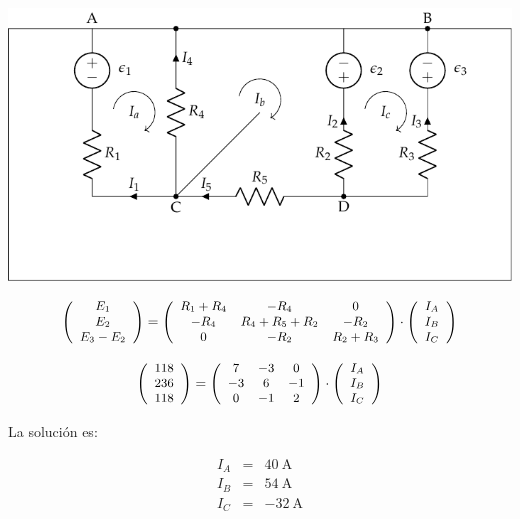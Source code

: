 \begin{center}
  \includegraphics{figuras/mallas_condensadores_sol.pdf}
\end{center}

\[
\small{
\left(\begin{array}{c}
    E_1\\
    E_2\\
    E_3 - E_2
  \end{array}\right) = \left(\begin{array}{ccc}
    R_1 + R_4 & -R_4 & 0\\
    -R_4 & R_4 + R_5 + R_2 & -R_{2}\\
    0 & -R_2 & R_2 + R_3
  \end{array}\right) \cdot \left(\begin{array}{c}
    I_{A}\\
    I_{B}\\
    I_{C}
  \end{array}\right)
}
\]

\[
\small{
\left(\begin{array}{c}
    118\\
    236\\
    118
  \end{array}\right) = \left(\begin{array}{ccc}
    7 & -3 & 0\\
    -3 & 6 & -1\\
    0 & -1 & 2
  \end{array}\right) \cdot \left(\begin{array}{c}
    I_{A}\\
    I_{B}\\
    I_{C}
  \end{array}\right)
}
\]

La solución es:

\begin{eqnarray*}
I_A & = & \qty{40}{\ampere}\\
I_B & = & \qty{54}{\ampere}\\
I_C & = & -\qty{32}{\ampere}
\end{eqnarray*}

